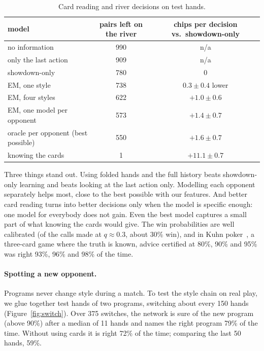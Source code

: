 \documentclass[11pt,a4paper]{article}
\begin{document}
\begin{table}[h]
\centering\small
\begin{tabular}{lcc}
\toprule
model & pairs left on the river & chips per decision vs.\ showdown-only\\
\midrule
no information               & 990 & n/a\\
only the last action~\cite{terry2005} & 909 & n/a\\
showdown-only                & 780 & 0\\
EM, one style                & 738 & $0.3\pm0.4$ lower\\
EM, four styles              & 622 & $+1.0\pm0.6$\\
EM, one model per opponent   & 573 & $+1.4\pm0.7$\\
oracle per opponent (best possible) & 550 & $+1.6\pm0.7$\\
knowing the cards            & 1   & $+11.1\pm0.7$\\
\bottomrule
\end{tabular}
\caption{Card reading and river decisions on test hands.}
\label{tab:main}
\end{table}

Three things stand out. Using folded hands and the full history beats
showdown-only learning and beats looking at the last action only. Modelling
each opponent separately helps most, close to the best possible with our
features. And better card reading turns into better decisions only when the
model is specific enough: one model for everybody does not gain. Even the best
model captures a small part of what knowing the cards would give. The win
probabilities are well calibrated (of the calls made at $q\approx0.3$, about
30\% win), and in Kuhn poker~\cite{kuhn1950}, a three-card game where the
truth is known, advice certified at 80\%, 90\% and 95\% was right 93\%, 96\% and
98\% of the time.

\paragraph{Spotting a new opponent.} Programs never change style during a
match. To test the style chain on real play, we glue together test hands of two
programs, switching about every 150 hands (Figure~\ref{fig:switch}). Over 375
switches, the network is sure of the new program (above 90\%) after a median of
11 hands and names the right program 79\% of the time. Without using cards it
is right 72\% of the time; comparing the last 50 hands, 59\%.
\end{document}
